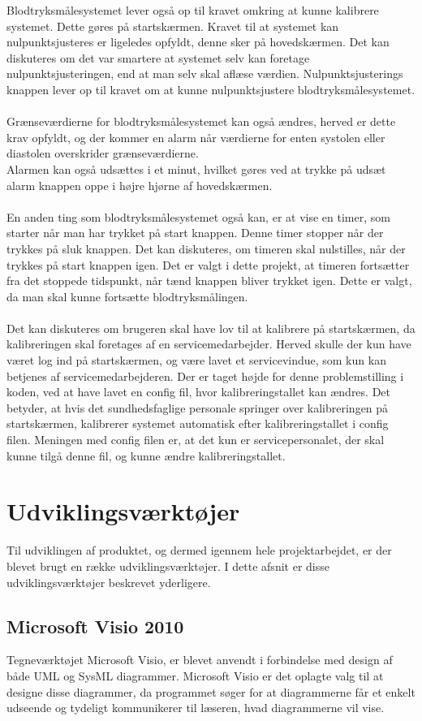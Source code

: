 Blodtryksmålesystemet lever også op til kravet omkring at kunne kalibrere systemet. Dette gøres på startskærmen. Kravet til at systemet kan nulpunktsjusteres er ligeledes opfyldt, denne sker på hovedskærmen. Det kan diskuteres om det var smartere at systemet selv kan foretage nulpunktsjusteringen, end at man selv skal aflæse værdien. Nulpunktsjusterings knappen lever op til kravet om at kunne nulpunktsjustere blodtryksmålesystemet. \\\\
Grænseværdierne for blodtryksmålesystemet kan også ændres, herved er dette krav opfyldt, og der kommer en alarm når værdierne for enten systolen eller diastolen overskrider grænseværdierne. \\
Alarmen kan også udsættes i et minut, hvilket gøres ved at trykke på udsæt alarm knappen oppe i højre hjørne af hovedskærmen. 
\\\\
En anden ting som blodtryksmålesystemet også kan, er at vise en timer, som starter når man har trykket på start knappen. Denne timer stopper når der trykkes på sluk knappen. Det kan diskuteres, om timeren skal nulstilles, når der trykkes på start knappen igen. Det er valgt i dette projekt, at timeren fortsætter fra det stoppede tidspunkt, når tænd knappen bliver trykket igen. Dette er valgt, da man skal kunne fortsætte blodtryksmålingen.
\\\\
Det kan diskuteres om brugeren skal have lov til at kalibrere på startskærmen, da kalibreringen skal foretages af en servicemedarbejder. Herved skulle der kun have været log ind på startskærmen, og være lavet et servicevindue, som kun kan betjenes af servicemedarbejderen. Der er taget højde for denne problemstilling i koden, ved at have lavet en config fil, hvor kalibreringstallet kan ændres. Det betyder, at hvis det sundhedsfaglige personale springer over kalibreringen på startskærmen, kalibrerer systemet automatisk efter kalibreringstallet i config filen. Meningen med config filen er, at det kun er servicepersonalet, der skal kunne tilgå denne fil, og kunne ændre kalibreringstallet. 
\section{Udviklingsværktøjer}
Til udviklingen af produktet, og dermed igennem hele projektarbejdet, er der blevet brugt en række udviklingsværktøjer. I dette afsnit er disse udviklingsværktøjer beskrevet yderligere.
\subsection{Microsoft Visio 2010}
Tegneværktøjet Microsoft Visio, er blevet anvendt i forbindelse med design af både UML og SysML diagrammer. Microsoft Visio er det oplagte valg til at designe disse diagrammer, da programmet søger for at diagrammerne får et enkelt udseende og tydeligt kommunikerer til læseren, hvad diagrammerne vil vise.
